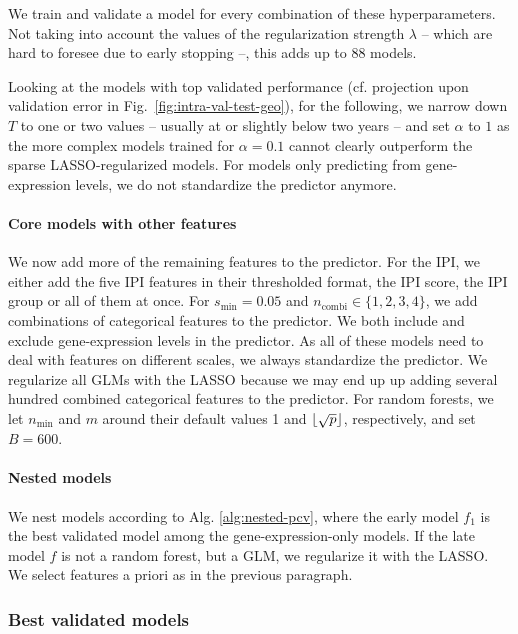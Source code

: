 We train and validate a model for every combination of these hyperparameters.
Not taking into account the values of the regularization strength $\lambda$ -- which are hard to 
foresee due to early stopping --, this adds up to \num{88} models.

Looking at the models with top validated performance (cf. projection upon validation error in Fig.\
\ref{fig:intra-val-test-geo}), for the following, we narrow down $T$ to one or 
two values -- usually at or slightly below two years -- and set $\alpha$ to $1$ as the more complex 
models trained for $\alpha = \num{0.1}$ cannot clearly outperform the sparse LASSO-regularized 
models. For models only predicting from gene-expression levels, we do not standardize the predictor 
anymore.

\paragraph{Core models with other features}
We now add more of the remaining features to the predictor. For the 
IPI, we either add the five IPI features in their thresholded format, the IPI score, the IPI group
or all of them at once. For $s_\text{min} = \num{0.05}$ 
and $n_\text{combi} \in \{1, 2, 3, 4 \}$, we add combinations of categorical features to the 
predictor. 
We both include and exclude gene-expression levels in the predictor.
As all of these models need to deal with features on different scales, we always 
standardize the predictor. We regularize all GLMs with the LASSO because we may end up up adding 
several hundred combined categorical features to the predictor. For random forests, we let 
$n_\text{min}$ and $m$ around their default values \num{1} and $\lfloor\sqrt{p}\rfloor$, respectively, and 
set $B = \num{600}$.

\paragraph{Nested models}
We nest models according to Alg. \ref{alg:nested-pcv}, where the early model $f_1$ is the best 
validated model among the gene-expression-only models. If the late model $f$ is not a random 
forest, but a GLM, we regularize it with the LASSO. We select features a priori as in the previous 
paragraph.

\subsubsection{Best validated models}

